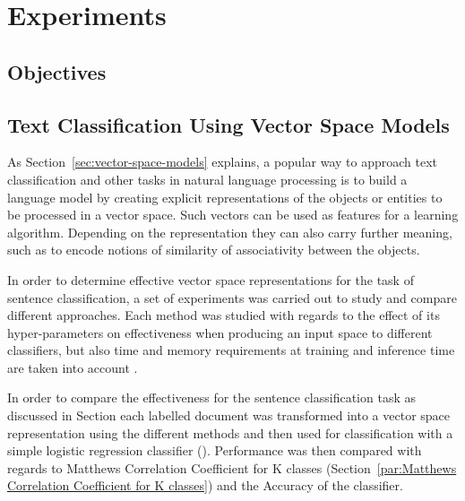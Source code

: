 
\thispagestyle{empty}

\section{Experiments}
\label{sec:Experiments}

\subsection{Objectives}
\label{sub:Objectives}




\subsection{Text Classification Using Vector Space Models}
\label{Text Classification Using Vector Space Models}

As Section~\ref{sec:vector-space-models} explains, a popular way to approach text classification and other tasks in natural language processing is to build a language model by creating explicit representations of the objects or entities to be processed in a vector space. Such vectors can be used as features for a learning algorithm. Depending on the representation they can also carry further meaning, such as to encode notions of similarity of associativity between the objects.

In order to determine effective vector space representations for the task of sentence classification, a set of experiments was carried out to study and compare different approaches. Each method was studied with regards to the effect of its hyper-parameters on effectiveness when producing an input space to different classifiers, but also time and memory requirements at training and inference time are taken into account .

In order to compare the effectiveness for the sentence classification task as discussed in Section each labelled document was transformed into a vector space representation using the different methods and then used for classification with a simple logistic regression classifier (). Performance was then compared with regards to Matthews Correlation Coefficient for K classes (Section~\ref{par:Matthews Correlation Coefficient for K classes}) and the Accuracy  of the classifier.

